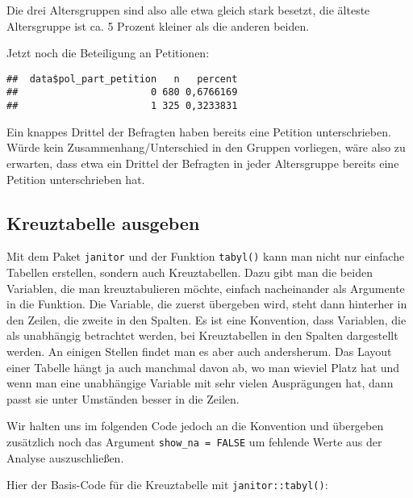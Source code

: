 \documentclass[
]{book}
\newenvironment{Shaded}{\begin{snugshade}}{\end{snugshade}}
\newcommand{\CommentTok}[1]{\textcolor[rgb]{0.56,0.35,0.01}{\textit{#1}}}
\newcommand{\FunctionTok}[1]{\textcolor[rgb]{0.00,0.00,0.00}{#1}}
\newcommand{\NormalTok}[1]{#1}
\newcommand{\SpecialCharTok}[1]{\textcolor[rgb]{0.00,0.00,0.00}{#1}}
\begin{document}
Die drei Altersgruppen sind also alle etwa gleich stark besetzt, die älteste Altersgruppe ist ca. 5 Prozent kleiner als die anderen beiden.

Jetzt noch die Beteiligung an Petitionen:

\begin{Shaded}
\end{Shaded}

\begin{verbatim}
##  data$pol_part_petition   n   percent
##                       0 680 0,6766169
##                       1 325 0,3233831
\end{verbatim}

Ein knappes Drittel der Befragten haben bereits eine Petition unterschrieben. Würde kein Zusammenhang/Unterschied in den Gruppen vorliegen, wäre also zu erwarten, dass etwa ein Drittel der Befragten in jeder Altersgruppe bereits eine Petition unterschrieben hat.

\hypertarget{kreuztabelle-ausgeben}{%
\subsection{Kreuztabelle ausgeben}\label{kreuztabelle-ausgeben}}

Mit dem Paket \texttt{janitor} und der Funktion \texttt{tabyl()} kann man nicht nur einfache Tabellen erstellen, sondern auch Kreuztabellen. Dazu gibt man die beiden Variablen, die man kreuztabulieren möchte, einfach nacheinander als Argumente in die Funktion. Die Variable, die zuerst übergeben wird, steht dann hinterher in den Zeilen, die zweite in den Spalten. Es ist eine Konvention, dass Variablen, die als unabhängig betrachtet werden, bei Kreuztabellen in den Spalten dargestellt werden. An einigen Stellen findet man es aber auch andersherum. Das Layout einer Tabelle hängt ja auch manchmal davon ab, wo man wieviel Platz hat und wenn man eine unabhängige Variable mit sehr vielen Ausprägungen hat, dann passt sie unter Umständen besser in die Zeilen.

Wir halten uns im folgenden Code jedoch an die Konvention und übergeben zusätzlich noch das Argument \texttt{show\_na\ =\ FALSE} um fehlende Werte aus der Analyse auszuschließen.

Hier der Basis-Code für die Kreuztabelle mit \texttt{janitor::tabyl()}:
\end{document}
